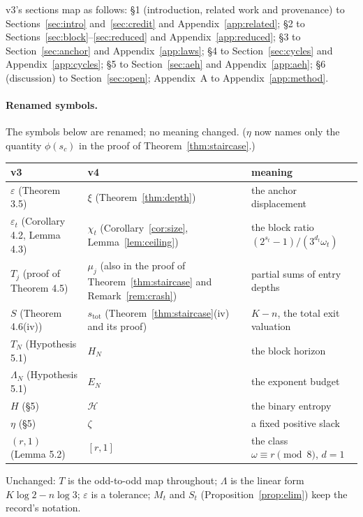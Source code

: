 \documentclass[11pt]{article}
\theoremstyle{remark}
\newcommand{\w}{\omega}
\newcommand{\stot}{s_{\mathrm{tot}}}
\newcommand{\Ent}{\mathcal{H}}
\begin{document}
v3's sections map as follows: \S1 (introduction, related work and provenance) to Sections~\ref{sec:intro} and~\ref{sec:credit} and Appendix~\ref{app:related}; \S2 to Sections~\ref{sec:block}--\ref{sec:reduced} and Appendix~\ref{app:reduced}; \S3 to Section~\ref{sec:anchor} and Appendix~\ref{app:laws}; \S4 to Section~\ref{sec:cycles} and Appendix~\ref{app:cycles}; \S5 to Section~\ref{sec:aeh} and Appendix~\ref{app:aeh}; \S6 (discussion) to Section~\ref{sec:open}; Appendix~A to Appendix~\ref{app:method}.

\paragraph{Renamed symbols.} The symbols below are renamed; no meaning changed. ($\eta$ now names only the quantity $\phi(s_c)$ in the proof of Theorem~\ref{thm:staircase}.)
\begin{center}
\small
\begin{tabular}{>{\raggedright\arraybackslash}p{}>{\raggedright\arraybackslash}p{}>{\raggedright\arraybackslash}p{}}
\hline
v3 & v4 & meaning \\
\hline
$\varepsilon$ (Theorem 3.5) & $\xi$ (Theorem~\ref{thm:depth}) & the anchor displacement \\
$\varepsilon_t$ (Corollary 4.2, Lemma 4.3) & $\chi_t$ (Corollary~\ref{cor:size}, Lemma~\ref{lem:ceiling}) & the block ratio $(2^{s_t}-1)/(3^{d_t}\w_t)$ \\
$T_j$ (proof of Theorem 4.5) & $\mu_j$ (also in the proof of Theorem~\ref{thm:staircase} and Remark~\ref{rem:crash}) & partial sums of entry depths \\
$S$ (Theorem 4.6(iv)) & $\stot$ (Theorem~\ref{thm:staircase}(iv) and its proof) & $K - n$, the total exit valuation \\
$T_N$ (Hypothesis 5.1) & $H_N$ & the block horizon \\
$\Lambda_N$ (Hypothesis 5.1) & $E_N$ & the exponent budget \\
$H$ (\S5) & $\Ent$ & the binary entropy \\
$\eta$ (\S5) & $\zeta$ & a fixed positive slack \\
$(r,1)$ (Lemma 5.2) & $[r,1]$ & the class $\w \equiv r \pmod 8$, $d = 1$ \\
\hline
\end{tabular}
\end{center}
Unchanged: $T$ is the odd-to-odd map throughout; $\Lambda$ is the linear form $K\log 2 - n\log 3$; $\varepsilon$ is a tolerance; $M_t$ and $S_t$ (Proposition~\ref{prop:elim}) keep the record's notation.
\end{document}
